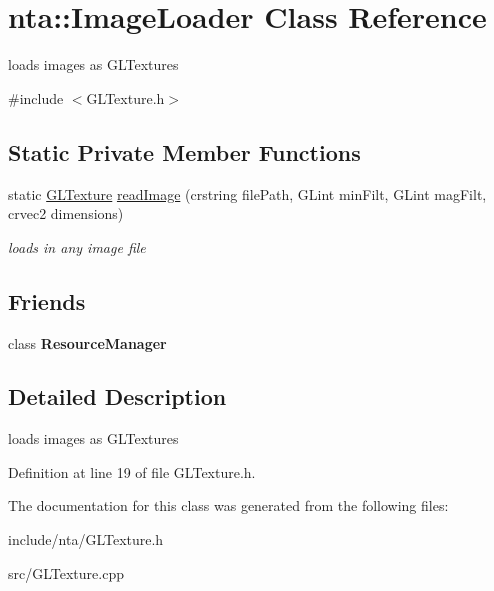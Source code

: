 \hypertarget{classnta_1_1ImageLoader}{}\section{nta\+:\+:Image\+Loader Class Reference}
\label{classnta_1_1ImageLoader}


loads images as G\+L\+Textures  




{\ttfamily \#include $<$G\+L\+Texture.\+h$>$}

\subsection*{Static Private Member Functions}
\begin{DoxyCompactItemize}
\item 
\mbox{\label{classnta_1_1ImageLoader_a9144fea6007e8dc1af75ee4da5a02f10}} 
static \hyperlink{namespacenta_d3/dff/structnta_1_1GLTexture}{G\+L\+Texture} \hyperlink{classnta_1_1ImageLoader_a9144fea6007e8dc1af75ee4da5a02f10}{read\+Image} (crstring file\+Path, G\+Lint min\+Filt, G\+Lint mag\+Filt, crvec2 dimensions)
\begin{DoxyCompactList}\small\item\em loads in any image file \end{DoxyCompactList}\end{DoxyCompactItemize}
\subsection*{Friends}
\begin{DoxyCompactItemize}
\item 
\mbox{\label{classnta_1_1ImageLoader_a54c1252abc87a78a301e6b6984470408}} 
class {\bfseries Resource\+Manager}
\end{DoxyCompactItemize}


\subsection{Detailed Description}
loads images as G\+L\+Textures 

Definition at line 19 of file G\+L\+Texture.\+h.



The documentation for this class was generated from the following files\+:\begin{DoxyCompactItemize}
\item 
include/nta/G\+L\+Texture.\+h\item 
src/G\+L\+Texture.\+cpp\end{DoxyCompactItemize}
